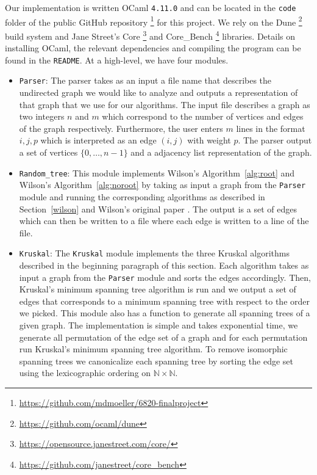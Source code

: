 \documentclass[11pt]{article}
\begin{document}
Our implementation is written OCaml \texttt{4.11.0} and can be located in the \texttt{code} folder of the public GitHub repository \footnote{\url{https://github.com/mdmoeller/6820-finalproject}} for this project. We rely on the Dune \footnote{\url{https://github.com/ocaml/dune}} build system and Jane Street's Core \footnote{\url{https://opensource.janestreet.com/core/}} and Core\_Bench \footnote{\url{https://github.com/janestreet/core_bench}} libraries. Details on installing OCaml, the relevant dependencies and compiling the program can be found in the \texttt{README}. At a high-level, we have four modules.

\begin{itemize}
\item \texttt{Parser}: The parser takes as an input a file name that describes the undirected graph we would like to analyze and outputs a representation of that graph that we use for our algorithms. The input file describes a graph as two integers $n$ and $m$ which correspond to the number of vertices and edges of the graph respectively. Furthermore, the user enters $m$ lines in the format $i,j,p$ which is interpreted as an edge $(i,j)$ with weight $p$. The parser output a set of vertices $\{0,\dots,n-1\}$ and a adjacency list representation of the graph.
\item \texttt{Random\_tree}: This module implements Wilson's Algorithm~\ref{alg:root} and Wilson's Algorithm~\ref{alg:noroot} by taking as input a graph from the \texttt{Parser} module and running the corresponding algorithms as described in Section~\ref{wilson} and Wilson's original paper \cite{wilson}. The output is a set of edges which can then be written to a file where each edge is written to a line of the file.
\item \texttt{Kruskal}: The \texttt{Kruskal} module implements the three Kruskal algorithms described in the beginning paragraph of this section. Each algorithm takes as input a graph from the \texttt{Parser} module and sorts the edges accordingly. Then, Kruskal's minimum spanning tree algorithm is run and we output a set of edges that corresponds to a minimum spanning tree with respect to the order we picked. This module also has a function to generate all spanning trees of a given graph. The implementation is simple and takes exponential time, we generate all permutation of the edge set of a graph and for each permutation run Kruskal's minimum spanning tree algorithm. To remove isomorphic spanning trees we canonicalize each spanning tree by sorting the edge set using the lexicographic ordering on $\mathbb{N}\times\mathbb{N}$.

\end{itemize}
\end{document}
